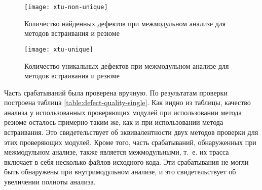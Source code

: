 \begin{figure}[h]
   \centering
   \texttt{[image: xtu-non-unique]}
   \caption{Количество найденных дефектов при межмодульном анализе для методов встраивания и резюме}\label{pic:xtu-non-unique}
\end{figure}


\begin{figure}[h]
   \centering
   \texttt{[image: xtu-unique]}
   \caption{Количество уникальных дефектов при межмодульном анализе для методов встраивания и резюме}\label{pic:xtu-unique}
\end{figure}

Часть срабатываний была проверена вручную. По результатам проверки построена таблица \ref{table:defect-quality-single}. Как видно из таблицы, качество анализа у использованных проверяющих модулей при использовании метода резюме осталось примерно таким же, как и при использовании метода встраивания. Это свидетельствует об эквивалентности двух методов проверки для этих проверяющих модулей. Кроме того, часть срабатываний, обнаруженных при межмодульном анализе, также является межмодульными, т.~е. их трасса включает в себя несколько файлов исходного кода. Эти срабатывания не могли быть обнаружены при внутримодульном анализе, и это свидетельствует об увеличении полноты анализа.

